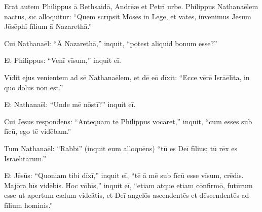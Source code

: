 \Versus Erat autem Philippus ā Bethsaidā, Andrēæ et Petrī urbe.
\Versus Philippus Nathanaēlem nactus, sīc alloquitur: ``Quem scrīpsit Mōsēs in Lēge, et vātēs, invēnimus Jēsum Jōsēphī fīlium ā Nazarethā.''

\Versus Cui Nathanaēl: ``Ā Nazarethā,'' inquit, ``potest aliquid bonum esse?''

Et Philippus: ``Venī vīsum,'' inquit eī.

\Versus Vīdit ejus venientem ad sē Nathanaēlem, et dē eō dīxit: ``Ecce vērē Isrāēlīta, in quō dolus nōn est.''

\Versus Et Nathanaēl: ``Unde mē nōstī?'' inquit eī.

Cui Jēsūs respondēns: ``Antequam tē Philippus vocāret,'' inquit, ``cum essēs sub fīcū, ego tē vidēbam.''

\Versus Tum Nathanaēl: ``Rabbi'' (inquit eum alloquēns) ``tū es Deī fīlius; tū rēx es Isrāēlītārum.''

\Versus Et Jēsūs: ``Quoniam tibi dīxī,'' inquit eī, ``tē ā mē sub fīcū esse vīsum, crēdis. Majōra hīs vidēbis.
\Versus Hoc vōbīs,'' inquit eī, ``etiam atque etiam cōnfirmō, futūrum esse ut apertum cælum videātis, et Deī angelōs ascendentēs et dēscendentēs ad fīlium hominis.''
